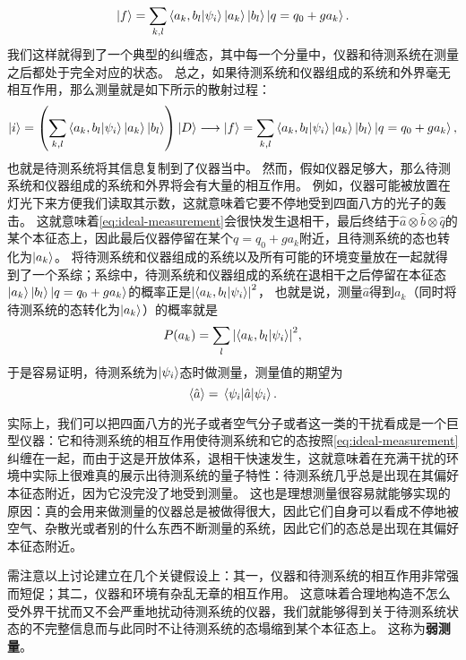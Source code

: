 \documentclass[hyperref, UTF8, a4paper]{ctexart}
\begin{document}
\begin{equation}
    \ket{f} = \sum_{k, l} \braket{a_k, b_l}{\psi_i} \ket{a_k} \ket{b_l} \ket{q = q_0 + g a_k}.
    \label{eq:ideal-measurement}
\end{equation}
我们这样就得到了一个典型的纠缠态，其中每一个分量中，仪器和待测系统在测量之后都处于完全对应的状态。
总之，如果待测系统和仪器组成的系统和外界毫无相互作用，那么测量就是如下所示的散射过程：
\[
    \ket{i} = \left(\sum_{k, l} \braket{a_k, b_l}{\psi_i} \ket{a_k} \ket{b_l} \right) \ket{D} \longrightarrow \ket{f} = \sum_{k, l} \braket{a_k, b_l}{\psi_i} \ket{a_k} \ket{b_l} \ket{q = q_0 + g a_k},
\]
也就是待测系统将其信息复制到了仪器当中。
然而，假如仪器足够大，那么待测系统和仪器组成的系统和外界将会有大量的相互作用。
例如，仪器可能被放置在灯光下来方便我们读取其示数，这就意味着它要不停地受到四面八方的光子的轰击。
这就意味着\eqref{eq:ideal-measurement}会很快发生退相干，最后终结于$\hat{a} \otimes \hat{b} \otimes \hat{q}$的某个本征态上，因此最后仪器停留在某个$q=q_0 + g a_k$附近，且待测系统的态也转化为$\ket{a_k}$。
将待测系统和仪器组成的系统以及所有可能的环境变量放在一起就得到了一个系综；系综中，待测系统和仪器组成的系统在退相干之后停留在本征态$\ket{a_k} \ket{b_l} \ket{q = q_0 + g a_k}$的概率正是$\abs{\braket{a_k, b_l}{\psi_i}}^2$，
也就是说，测量$\hat{a}$得到$a_k$（同时将待测系统的态转化为$\ket{a_k}$）的概率就是
\begin{equation}
    P(a_k) = \sum_l \abs{\braket{a_k, b_l}{\psi_i}}^2,
\end{equation}
于是容易证明，待测系统为$\ket{\psi_i}$态时做测量，测量值的期望为
\begin{equation}
    \expval{\hat{a}} = \mel{\psi_i}{\hat{a}}{\psi_i}.
\end{equation}

实际上，我们可以把四面八方的光子或者空气分子或者这一类的干扰看成是一个巨型仪器：它和待测系统的相互作用使待测系统和它的态按照\eqref{eq:ideal-measurement}纠缠在一起，而由于这是开放体系，退相干快速发生，这就意味着在充满干扰的环境中实际上很难真的展示出待测系统的量子特性：待测系统几乎总是出现在其偏好本征态附近，因为它没完没了地受到测量。
这也是理想测量很容易就能够实现的原因：真的会用来做测量的仪器总是被做得很大，因此它们自身可以看成不停地被空气、杂散光或者别的什么东西不断测量的系统，因此它们的态总是出现在其偏好本征态附近。

需注意以上讨论建立在几个关键假设上：其一，仪器和待测系统的相互作用非常强而短促；其二，仪器和环境有杂乱无章的相互作用。
这意味着合理地构造不怎么受外界干扰而又不会严重地扰动待测系统的仪器，我们就能够得到关于待测系统状态的不完整信息而与此同时不让待测系统的态塌缩到某个本征态上。
这称为\textbf{弱测量}。
\end{document}

